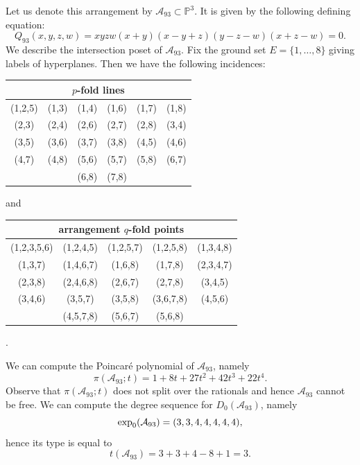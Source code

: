 \documentclass[11pt]{article}
\theoremstyle{plain}
\theoremstyle{definition}
\begin{document}
\noindent
{}
\vskip 5pt
\noindent
Let us denote this arrangement by $\mathcal{A}_{93} \subset \mathbb{P}^{3}$. It is given by the following defining equation:
$$Q_{93}(x,y,z,w) = xyzw(x+y)(x-y+z)(y-z-w)(x+z-w)=0.$$
We describe the intersection poset of $\mathcal{A}_{93}$. Fix the ground set $E= \{1, \ldots , 8\}$ giving labels of hyperplanes. Then we have the following incidences:
\begin{center}
\begin{tabular}{ c c c c c c }
\multicolumn{6}{c}{$p$-fold lines} \\\hline \hline
(1,2,5) &  (1,3) &  (1,4) &  (1,6) &  (1,7) &  (1,8)\\
(2,3) &  (2,4) &  (2,6) &  (2,7) &  (2,8) &  (3,4) \\  
(3,5) &  (3,6) &  (3,7) &  (3,8) &  (4,5) &  (4,6) \\  
(4,7) &  (4,8) &  (5,6) &  (5,7) &  (5,8) &  (6,7)\\  
& &  (6,8) & (7,8) & & \\
\end{tabular}
\end{center}
and 
\begin{center}
\begin{tabular}{ c c c c c }
\multicolumn{5}{c}{arrangement $q$-fold points} \\ \hline \hline 
 (1,2,3,5,6) &  (1,2,4,5) &  (1,2,5,7) &  (1,2,5,8) &  (1,3,4,8) \\
 (1,3,7) &  (1,4,6,7) &  (1,6,8) &  (1,7,8) &  (2,3,4,7)\\  
 (2,3,8) &  (2,4,6,8) &  (2,6,7) &  (2,7,8) &  (3,4,5)\\ 
 (3,4,6) &  (3,5,7) &  (3,5,8) &  (3,6,7,8) &  (4,5,6)\\ 
 & (4,5,7,8) &  (5,6,7) &  (5,6,8) & \\
\end{tabular}.
\end{center}
We can compute the Poincar\'e polynomial of $\mathcal{A}_{93}$, namely
$$\pi(\mathcal{A}_{93};t) = 1 + 8t + 27t^{2} + 42t^{3} + 22t^{4}.$$
Observe that $\pi(\mathcal{A}_{93};t)$ does not split over the rationals and hence $\mathcal{A}_{93}$ cannot be free. We can compute the degree sequence for $D_{0}(\mathcal{A}_{93})$, namely
$${\rm exp}_{0}(\mathcal{A}_{93}) = (3,3,4,4,4,4,4),$$
hence its type is equal to
$$t(\mathcal{A}_{93})=3+3+4-8+1 = 3.$$
\end{document}
